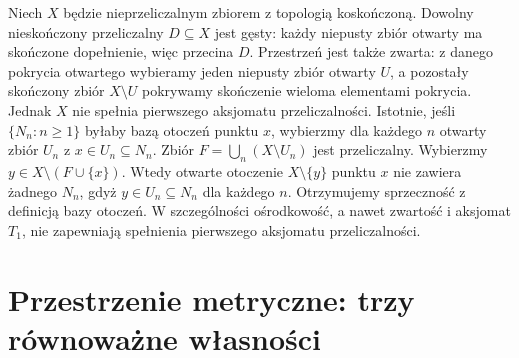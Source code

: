 \begin{przyklad}
\label{ex:topog-kosk-onczona-nie-pierwsza}
Niech $X$ będzie nieprzeliczalnym zbiorem z topologią
koskończoną. Dowolny nieskończony przeliczalny
$D\subseteq X$ jest gęsty: każdy niepusty zbiór otwarty
ma skończone dopełnienie, więc przecina $D$.
Przestrzeń jest także zwarta: z danego pokrycia otwartego
wybieramy jeden niepusty zbiór otwarty $U$, a pozostały
skończony zbiór $X\setminus U$ pokrywamy skończenie
wieloma elementami pokrycia.
Jednak $X$ nie spełnia pierwszego aksjomatu przeliczalności.
Istotnie, jeśli $\{N_n:n\geq1\}$ byłaby bazą otoczeń
punktu $x$, wybierzmy dla każdego $n$ otwarty zbiór
$U_n$ z $x\in U_n\subseteq N_n$. Zbiór
$F=\bigcup_n(X\setminus U_n)$ jest przeliczalny.
Wybierzmy $y\in X\setminus(F\cup\{x\})$. Wtedy
otwarte otoczenie $X\setminus\{y\}$ punktu $x$
nie zawiera żadnego $N_n$, gdyż
$y\in U_n\subseteq N_n$ dla każdego $n$.
Otrzymujemy sprzeczność z definicją bazy otoczeń.
W szczególności ośrodkowość, a nawet zwartość i aksjomat
$T_1$, nie zapewniają spełnienia pierwszego aksjomatu przeliczalności.
\end{przyklad}

\section{Przestrzenie metryczne: trzy równoważne własności}
\label{sec:topog-przeliczalnosc-metryczna}

